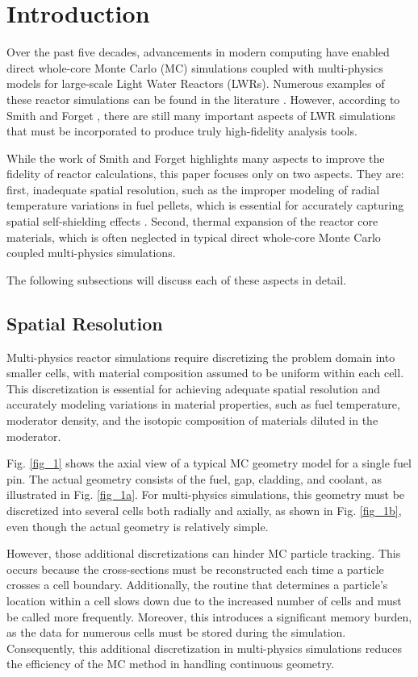 \section{Introduction}

Over the past five decades, advancements in modern computing have enabled direct whole-core Monte Carlo (MC) simulations coupled with multi-physics models for large-scale Light Water Reactors (LWRs). Numerous examples of these reactor simulations can be found in the literature \cite{tung_2020,kelly_2017,ma_2019}. However, according to Smith and Forget \cite{smith_2013}, there are still many important aspects of LWR simulations that must be incorporated to produce truly high-fidelity analysis tools.

While the work of Smith and Forget highlights many aspects to improve the fidelity of reactor calculations, this paper focuses only on two aspects. They are: first, inadequate spatial resolution, such as the improper modeling of radial temperature variations in fuel pellets, which is essential for accurately capturing spatial self-shielding effects \cite{nchoi_2020}. Second, thermal expansion of the reactor core materials, which is often neglected in typical direct whole-core Monte Carlo coupled multi-physics simulations.

The following subsections will discuss each of these aspects in detail.

\subsection{Spatial Resolution}

Multi-physics reactor simulations require discretizing the problem domain into smaller cells, with material composition assumed to be uniform within each cell. This discretization is essential for achieving adequate spatial resolution and accurately modeling variations in material properties, such as fuel temperature, moderator density, and the isotopic composition of materials diluted in the moderator.

Fig. \ref{fig_1} shows the axial view of a typical MC geometry model for a single fuel pin. The actual geometry consists of the fuel, gap, cladding, and coolant, as illustrated in Fig. \ref{fig_1a}. For multi-physics simulations, this geometry must be discretized into several cells both radially and axially, as shown in Fig. \ref{fig_1b}, even though the actual geometry is relatively simple.

However, those additional discretizations can hinder MC particle tracking. This occurs because the cross-sections must be reconstructed each time a particle crosses a cell boundary. Additionally, the routine that determines a particle's location within a cell slows down due to the increased number of cells and must be called more frequently. Moreover, this introduces a significant memory burden, as the data for numerous cells must be stored during the simulation. Consequently, this additional discretization in multi-physics simulations reduces the efficiency of the MC method in handling continuous geometry.

